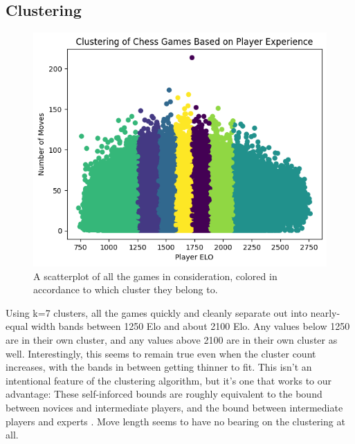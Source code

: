 \documentclass[conference]{IEEEtran}
\begin{document}
\subsection{Clustering}

\begin{figure}[htbp]
\centerline{\includegraphics[scale=0.5]{Clustering of Chess Games Based on Experience.png}}
\label{fig:cluster-results}
\caption{A scatterplot of all the games in consideration, colored in accordance to which cluster they belong to.}
\end{figure}

Using k=7 clusters, all the games quickly and cleanly separate out into nearly-equal width bands between 1250 Elo and about 2100 Elo. Any values below 1250 are in their own cluster, and any values above 2100 are in their own cluster as well. Interestingly, this seems to remain true even when the cluster count increases, with the bands in between getting thinner to fit. This isn't an intentional feature of the clustering algorithm, but it's one that works to our advantage: These self-inforced bounds are roughly equivalent to the bound between novices and intermediate players, and the bound between intermediate players and experts \cite{b6}. Move length seems to have no bearing on the clustering at all.
\end{document}

